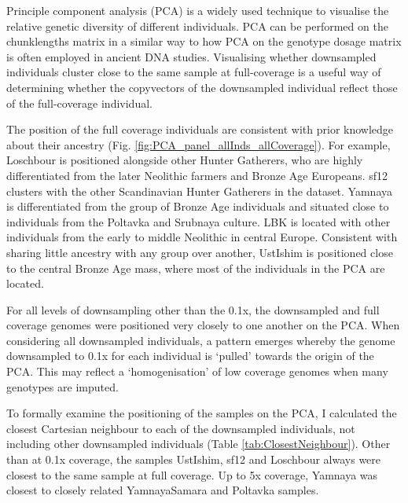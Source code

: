 Principle component analysis (PCA) is a widely used technique to visualise the relative genetic diversity of different individuals. PCA can be performed on the chunklengths matrix in a similar way to how PCA on the genotype dosage matrix is often employed in ancient DNA studies. Visualising whether downsampled individuals cluster close to the same sample at full-coverage is a useful way of determining whether the copyvectors of the downsampled individual reflect those of the full-coverage individual.

The position of the full coverage individuals are consistent with prior knowledge about their ancestry (Fig. \ref{fig:PCA_panel_allInds_allCoverage}). For example, Loschbour is positioned alongside other Hunter Gatherers, who are highly differentiated from the later Neolithic farmers and Bronze Age Europeans. sf12 clusters with the other Scandinavian Hunter Gatherers in the dataset. Yamnaya is differentiated from the group of Bronze Age individuals and situated close to individuals from the Poltavka and Srubnaya culture. LBK is located with other individuals from the early to middle Neolithic in central Europe. Consistent with sharing little ancestry with any group over another, UstIshim is positioned close to the central Bronze Age mass, where most of the individuals in the PCA are located. 

For all levels of downsampling other than the 0.1x, the downsampled and full coverage genomes were positioned very closely to one another on the PCA. When considering all downsampled individuals, a pattern emerges whereby the genome downsampled to 0.1x for each individual is `pulled' towards the origin of the PCA. This may reflect a `homogenisation' of low coverage genomes when many genotypes are imputed.

To formally examine the positioning of the samples on the PCA, I calculated the closest Cartesian neighbour to each of the downsampled individuals, not including other downsampled individuals (Table \ref{tab:ClosestNeighbour}). Other than at 0.1x coverage, the samples UstIshim, sf12 and Loschbour always were closest to the same sample at full coverage. Up to 5x coverage, Yamnaya was closest to closely related YamnayaSamara and Poltavka samples. 


